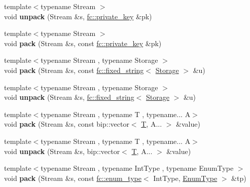 \begin{DoxyCompactItemize}
{\footnotesize template$<$typename Stream $>$ }\\void {\bfseries unpack} (Stream \&s, \mbox{\hyperlink{classfc_1_1private__key}{fc\+::private\+\_\+key}} \&pk)
\item 
\mbox{\label{namespacefc_1_1raw_aaf024a15456163a6f87e91a6fd9d79eb}} 
{\footnotesize template$<$typename Stream $>$ }\\void {\bfseries pack} (Stream \&s, const \mbox{\hyperlink{classfc_1_1private__key}{fc\+::private\+\_\+key}} \&pk)
\item 
\mbox{\label{namespacefc_1_1raw_ad16e9fa73c9e4d1c2864d9dfe08cec0b}} 
{\footnotesize template$<$typename Stream , typename Storage $>$ }\\void {\bfseries pack} (Stream \&s, const \mbox{\hyperlink{classfc_1_1fixed__string}{fc\+::fixed\+\_\+string}}$<$ \mbox{\hyperlink{struct_storage}{Storage}} $>$ \&u)
\item 
\mbox{\label{namespacefc_1_1raw_a396b70a7749206abf6d2f90f4122fec3}} 
{\footnotesize template$<$typename Stream , typename Storage $>$ }\\void {\bfseries unpack} (Stream \&s, \mbox{\hyperlink{classfc_1_1fixed__string}{fc\+::fixed\+\_\+string}}$<$ \mbox{\hyperlink{struct_storage}{Storage}} $>$ \&u)
\item 
\mbox{\label{namespacefc_1_1raw_a8a070216094a1b6be9db0faedca19db6}} 
{\footnotesize template$<$typename Stream , typename T , typename... A$>$ }\\void {\bfseries pack} (Stream \&s, const bip\+::vector$<$ \mbox{\hyperlink{struct_t}{T}}, A... $>$ \&value)
\item 
\mbox{\label{namespacefc_1_1raw_a8fd2a98c0e08cf15f03343c258b8037a}} 
{\footnotesize template$<$typename Stream , typename T , typename... A$>$ }\\void {\bfseries unpack} (Stream \&s, bip\+::vector$<$ \mbox{\hyperlink{struct_t}{T}}, A... $>$ \&value)
\item 
\mbox{\label{namespacefc_1_1raw_aaab001dba3d9f44e2dd3c783140f0ce6}} 
{\footnotesize template$<$typename Stream , typename Int\+Type , typename Enum\+Type $>$ }\\void {\bfseries pack} (Stream \&s, const \mbox{\hyperlink{classfc_1_1enum__type}{fc\+::enum\+\_\+type}}$<$ Int\+Type, \mbox{\hyperlink{struct_enum_type}{Enum\+Type}} $>$ \&tp)

\end{DoxyCompactItemize}
